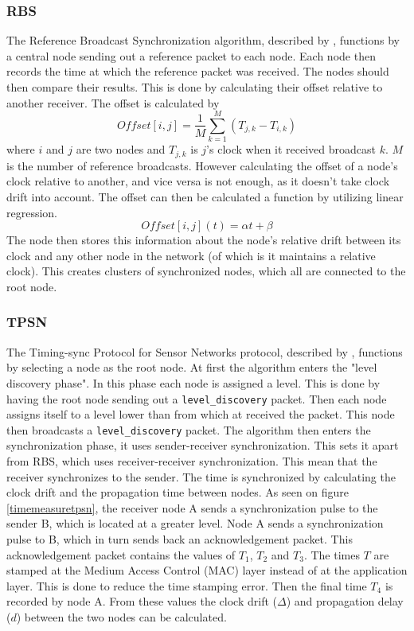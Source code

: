 \documentclass[a4paper,12pt]{article}
\begin{document}
    \subsubsection{RBS} The Reference Broadcast Synchronization algorithm, described by \citet{ElsonGirodEstrin02},  functions by a central node sending out a reference packet to each node. Each node then records the time at which the reference packet was received. %
    The nodes should then compare their results. This is done by calculating their offset relative to another receiver. The offset is calculated by 
    \begin{equation}
        \label{offsetcalc}
        \textit{Offset} [i,j] = \frac{1}{M}\sum^M_{k=1} (T_{j,k} - T_{i,k})
    \end{equation}
    where $i$ and $j$ are two nodes and $T_{j,k}$ is $j$'s clock when it received broadcast $k$. $M$ is the number of reference broadcasts.  %
    However calculating the offset of a node's clock relative to another, and vice versa is not enough, as it doesn't take clock drift into account. The offset can then be calculated a function by utilizing linear regression. 
    $$\textit{Offset}[i,j](t) = \alpha t + \beta$$
    The node then stores this information about the node's relative drift between its clock and any other node in the network (of which is it maintains a relative clock). This creates clusters of synchronized nodes, which all are connected to the root node.
    
    \subsubsection{TPSN} The Timing-sync Protocol for Sensor Networks protocol, described by \citet{GaneriwalEtAl03}, functions by selecting a node as the root node. At first the algorithm enters the "level discovery phase". In this  phase each node is assigned a level. This is done by having the root node sending out a \texttt{level\_discovery} packet. Then each node assigns itself to a level lower than from which at received the packet. This node then broadcasts a \texttt{level\_discovery} packet. The algorithm then enters the synchronization phase, it uses sender-receiver synchronization. This sets it apart from RBS, which uses receiver-receiver synchronization. This mean that the receiver synchronizes to the sender. The time is synchronized by calculating the clock drift and the propagation time between nodes. As seen on figure \ref{timemeasuretpsn}, the receiver node A sends a synchronization pulse to the sender B, which is located at a greater level. Node A sends a synchronization pulse to B, which in turn sends back an acknowledgement packet. This acknowledgement packet contains the values of $T_1$, $T_2$ and $T_3$. The times $T$ are stamped at the Medium Access Control (MAC) layer instead of at the application layer. This is done to reduce the time stamping error.  Then the final time $T_4$ is recorded by node A.  From these values the clock drift ($\Delta$) and propagation delay ($d$) between the two nodes can be calculated. 
    
\end{document}
